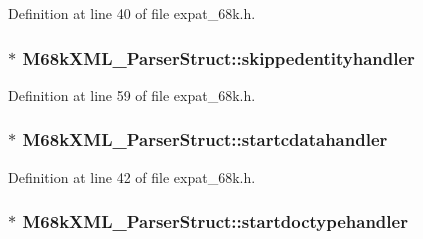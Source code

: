 Definition at line 40 of file expat\+\_\+68k.\+h.

\subsubsection[{\texorpdfstring{skippedentityhandler}{skippedentityhandler}}]{$\ast$ M68k\+X\+M\+L\+\_\+\+Parser\+Struct\+::skippedentityhandler}\hypertarget{struct_m68k_x_m_l___parser_struct_a56f4f7320110aea4840ca5eda61d0233}{}\label{struct_m68k_x_m_l___parser_struct_a56f4f7320110aea4840ca5eda61d0233}


Definition at line 59 of file expat\+\_\+68k.\+h.

\subsubsection[{\texorpdfstring{startcdatahandler}{startcdatahandler}}]{$\ast$ M68k\+X\+M\+L\+\_\+\+Parser\+Struct\+::startcdatahandler}\hypertarget{struct_m68k_x_m_l___parser_struct_a0ed4830394731f016bcee8ddb23097c4}{}\label{struct_m68k_x_m_l___parser_struct_a0ed4830394731f016bcee8ddb23097c4}


Definition at line 42 of file expat\+\_\+68k.\+h.

\subsubsection[{\texorpdfstring{startdoctypehandler}{startdoctypehandler}}]{$\ast$ M68k\+X\+M\+L\+\_\+\+Parser\+Struct\+::startdoctypehandler}\hypertarget{struct_m68k_x_m_l___parser_struct_a6d074d0e4eff80281f01ee5fb25fbae4}{}\label{struct_m68k_x_m_l___parser_struct_a6d074d0e4eff80281f01ee5fb25fbae4}


